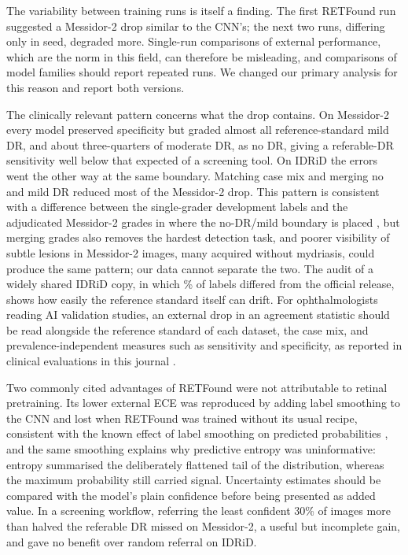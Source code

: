 \documentclass[pdflatex,sn-basic,Numbered]{sn-jnl}
\begin{document}
The variability between training runs is itself a finding. The first RETFound run suggested a Messidor-2 drop similar to the CNN's; the next two runs, differing only in seed, degraded more. Single-run comparisons of external performance, which are the norm in this field, can therefore be misleading, and comparisons of model families should report repeated runs. We changed our primary analysis for this reason and report both versions.

The clinically relevant pattern concerns what the drop contains. On Messidor-2 every model preserved specificity but graded almost all reference-standard mild DR, and about three-quarters of moderate DR, as no DR, giving a referable-DR sensitivity well below that expected of a screening tool. On IDRiD the errors went the other way at the same boundary. Matching case mix and merging no and mild DR reduced most of the Messidor-2 drop. This pattern is consistent with a difference between the single-grader development labels and the adjudicated Messidor-2 grades in where the no-DR/mild boundary is placed \cite{krause2018}, but merging grades also removes the hardest detection task, and poorer visibility of subtle lesions in Messidor-2 images, many acquired without mydriasis, could produce the same pattern; our data cannot separate the two. The audit of a widely shared IDRiD copy, in which \% of labels differed from the official release, shows how easily the reference standard itself can drift. For ophthalmologists reading AI validation studies, an external drop in an agreement statistic should be read alongside the reference standard of each dataset, the case mix, and prevalence-independent measures such as sensitivity and specificity, as reported in clinical evaluations in this journal \cite{vought2023eyeart}.

Two commonly cited advantages of RETFound were not attributable to retinal pretraining. Its lower external ECE was reproduced by adding label smoothing to the CNN and lost when RETFound was trained without its usual recipe, consistent with the known effect of label smoothing on predicted probabilities \cite{muller2019labelsmoothing}, and the same smoothing explains why predictive entropy was uninformative: entropy summarised the deliberately flattened tail of the distribution, whereas the maximum probability still carried signal. Uncertainty estimates should be compared with the model's plain confidence before being presented as added value. In a screening workflow, referring the least confident 30\% of images more than halved the referable DR missed on Messidor-2, a useful but incomplete gain, and gave no benefit over random referral on IDRiD.
\end{document}
